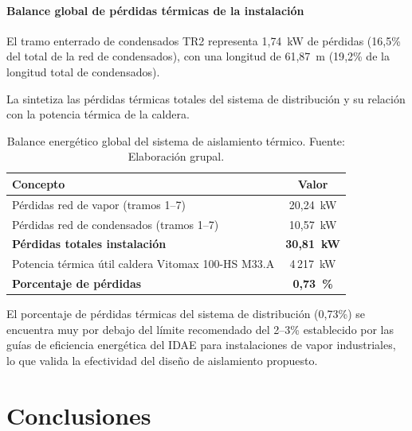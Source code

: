 \documentclass[12pt]{article}
\begin{document}
\paragraph{Balance global de pérdidas térmicas de la instalación}
\label{par:balance_global_aislamiento}

El tramo enterrado de condensados TR2 representa 1{,}74~kW de pérdidas (16{,}5\% del total de la red de condensados), con una longitud de 61{,}87~m (19{,}2\% de la longitud total de condensados).

La  sintetiza las pérdidas térmicas totales del sistema de distribución y su relación con la potencia térmica de la caldera.

\begin{table}[htbp]
	\centering
	\caption{Balance energético global del sistema de aislamiento térmico. Fuente: Elaboración grupal.}
	\label{tab:balance_global_aislamiento}
	\begin{tabular}{lc}
		\toprule
		\textbf{Concepto}                                  & \textbf{Valor}      \\
		\midrule
		Pérdidas red de vapor (tramos 1--7)                & 20{,}24~kW          \\
		Pérdidas red de condensados (tramos 1--7)          & 10{,}57~kW          \\
		\midrule
		\textbf{Pérdidas totales instalación}              & \textbf{30{,}81~kW} \\
		\midrule[0.5pt]
		Potencia térmica útil caldera Vitomax 100-HS M33.A & 4\,217~kW           \\
		\midrule
		\textbf{Porcentaje de pérdidas}                    & \textbf{0{,}73~\%}  \\
		\bottomrule
	\end{tabular}
\end{table}

El porcentaje de pérdidas térmicas del sistema de distribución (0{,}73\%) se encuentra muy por debajo del límite recomendado del 2--3\% establecido por las guías de eficiencia energética del IDAE \cite{IDAE2007} para instalaciones de vapor industriales, lo que valida la efectividad del diseño de aislamiento propuesto.





\section{Conclusiones}
\label{sec:conclusiones}
\end{document}
